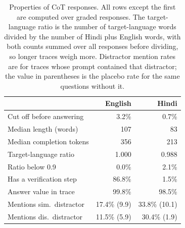 \begin{table}[t]
\centering
\small
\setlength{\tabcolsep}{4pt}
\begin{tabular}{lrr}
\toprule
 & English & Hindi \\
\midrule
Cut off before answering & 3.2\% & 0.7\% \\
Median length (words) & 107 & 83 \\
Median completion tokens & 356 & 213 \\
Target-language ratio & 1.000 & 0.988 \\
Ratio below 0.9 & 0.0\% & 2.1\% \\
Has a verification step & 86.8\% & 1.5\% \\
Answer value in trace & 99.8\% & 98.5\% \\
Mentions sim.\ distractor & 17.4\% (9.9) & 33.8\% (10.1) \\
Mentions dis.\ distractor & 11.5\% (5.9) & 30.4\% (1.9) \\
\bottomrule
\end{tabular}
\caption{Properties of CoT responses. All rows except the first are computed over graded responses. The target-language ratio is the number of target-language words divided by the number of Hindi plus English words, with both counts summed over all responses before dividing, so longer traces weigh more. Distractor mention rates are for traces whose prompt contained that distractor; the value in parentheses is the placebo rate for the same questions without it.}
\label{tab:trace}
\end{table}
